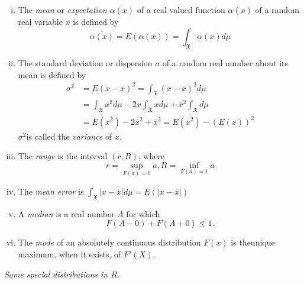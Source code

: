 \begin{enumerate}[(i)]
\item   The \textit{mean} or \textit{expectation}
  $\overline{\alpha{(x)}}$ of a real 
  valued function $\alpha (x)$ of a random real variable $x$ is defined
  by 
  $$
  \overline{\alpha(x)} = E(\alpha(x)) = \int_{\mathfrak{X}} \alpha(x)d \mu 
  $$
\item  The standard deviation or dispersion $\sigma$ of a random real
  number about its mean is defined by  
  \begin{align*}
    \sigma^{2} &= E(x -\overline{x})^2 = \int_{\mathfrak{X}}(x -
    \overline{x})^2 d\mu \\ 
    &=\int_{\mathfrak{X}}x^2 d \mu - 2x \int_{\mathfrak{X}} xd\mu +
    \overline{x}^{2} \int_{\mathfrak{X}} d\mu\\ 
    &=E(x^2) - 2\overline{x}^2 + \overline{x}^2 = E(x^2) - (E(x))^2
  \end{align*}
  $\sigma^2 $is called the \textit{variance} of $x$.
  
\item The \textit{range} is the interval $(r,R)$, where 
  $$
  r=\sup_{F(a)=0} a , R= \inf_{F(a) = 1} a
  $$
\item The \textit{mean error} is $\int_{\mathfrak{X}}|x - \overline{x}| d \mu =
  E(|x - \overline{x}|)$ 
\item A \textit{median} is a real number $A$ for which
  $$F
  (A - 0) + F(A + 0) \leq 1.
  $$
\item The \textit{mode} of an absolutely continuous distribution
  $F(x)$ is the\break  unique maximum, when it exists, of $F'(X)$. 
\end{enumerate}

\noindent \textit{Some special distributions in $R$.}


